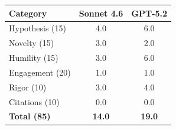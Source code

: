 \documentclass[11pt]{article}
\begin{document}
\medskip

\begin{tabular}{lcc}
\toprule
\textbf{Category} & \textbf{Sonnet 4.6} & \textbf{GPT-5.2} \\
\midrule
Hypothesis (15) & 4.0 & 6.0 \\
Novelty (15) & 3.0 & 2.0 \\
Humility (15) & 3.0 & 6.0 \\
Engagement (20) & 1.0 & 1.0 \\
Rigor (10) & 3.0 & 4.0 \\
Citations (10) & 0.0 & 0.0 \\
\midrule
\textbf{Total (85)} & \textbf{14.0} & \textbf{19.0} \\
\bottomrule
\end{tabular}

\bigskip
\end{document}
